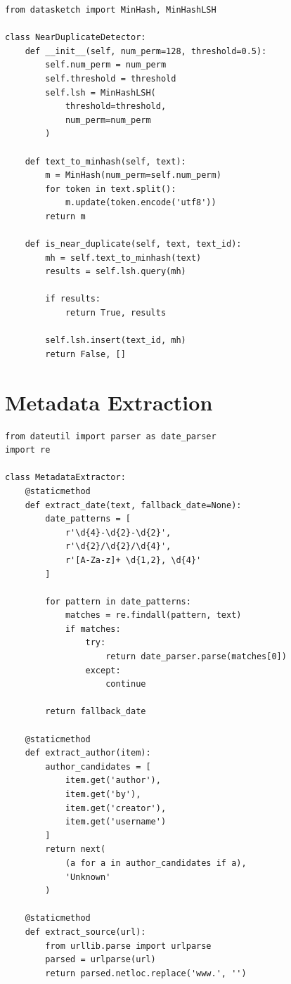 \documentclass[12pt,a4paper]{report}
\begin{document}
\begin{lstlisting}
from datasketch import MinHash, MinHashLSH

class NearDuplicateDetector:
    def __init__(self, num_perm=128, threshold=0.5):
        self.num_perm = num_perm
        self.threshold = threshold
        self.lsh = MinHashLSH(
            threshold=threshold,
            num_perm=num_perm
        )
    
    def text_to_minhash(self, text):
        m = MinHash(num_perm=self.num_perm)
        for token in text.split():
            m.update(token.encode('utf8'))
        return m
    
    def is_near_duplicate(self, text, text_id):
        mh = self.text_to_minhash(text)
        results = self.lsh.query(mh)
        
        if results:
            return True, results
        
        self.lsh.insert(text_id, mh)
        return False, []
\end{lstlisting}

\section{Metadata Extraction}

\begin{lstlisting}
from dateutil import parser as date_parser
import re

class MetadataExtractor:
    @staticmethod
    def extract_date(text, fallback_date=None):
        date_patterns = [
            r'\d{4}-\d{2}-\d{2}',
            r'\d{2}/\d{2}/\d{4}',
            r'[A-Za-z]+ \d{1,2}, \d{4}'
        ]
        
        for pattern in date_patterns:
            matches = re.findall(pattern, text)
            if matches:
                try:
                    return date_parser.parse(matches[0])
                except:
                    continue
        
        return fallback_date
    
    @staticmethod
    def extract_author(item):
        author_candidates = [
            item.get('author'),
            item.get('by'),
            item.get('creator'),
            item.get('username')
        ]
        return next(
            (a for a in author_candidates if a),
            'Unknown'
        )
    
    @staticmethod
    def extract_source(url):
        from urllib.parse import urlparse
        parsed = urlparse(url)
        return parsed.netloc.replace('www.', '')
\end{lstlisting}
\end{document}
